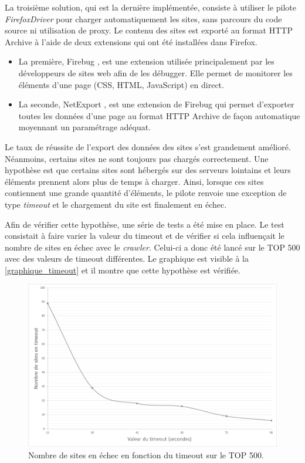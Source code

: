 La troisième solution, qui est la dernière implémentée, consiste à utiliser le pilote \textit{FirefoxDriver} pour charger automatiquement les sites, sans parcours du code source ni utilisation de proxy. Le contenu des sites est exporté au format HTTP Archive à l'aide de deux extensions qui ont été installées dans Firefox.
\begin{itemize}
	\item La première, Firebug \cite{firebug_homepage}, est une extension utilisée principalement par les développeurs de sites web afin de les débugger. Elle permet de monitorer les éléments d'une page (CSS, HTML, JavaScript) en direct.
	\item La seconde, NetExport \cite{netexport_homepage}, est une extension de Firebug qui permet d'exporter toutes les données d'une page au format HTTP Archive de façon automatique moyennant un paramétrage adéquat.
\end{itemize}

Le taux de réussite de l'export des données des sites s'est grandement amélioré. Néanmoins, certains sites ne sont toujours pas chargés correctement.
Une hypothèse est que certains sites sont hébergés sur des serveurs lointains et leurs éléments prennent alors plus de temps à charger. Ainsi, lorsque ces sites contiennent une grande quantité d'éléments, le pilote renvoie une exception de type \textit{timeout} et le chargement du site est finalement en échec.

Afin de vérifier cette hypothèse, une série de tests a été mise en place. Le test consistait à faire varier la valeur du timeout et de vérifier si cela influençait le nombre de sites en échec avec le \textit{crawler}. Celui-ci a donc été lancé sur le TOP 500 avec des valeurs de timeout différentes.
Le graphique est visible à la \autoref{graphique_timeout} et il montre que cette hypothèse est vérifiée.
\newline

\begin{figure}[!h]
	\centering
	\includegraphics[scale=.6]{timeouts/Timeouts_NB.png}
	\caption{\label{graphique_timeout}Nombre de sites en échec en fonction du timeout sur le TOP 500.}
\end{figure}

